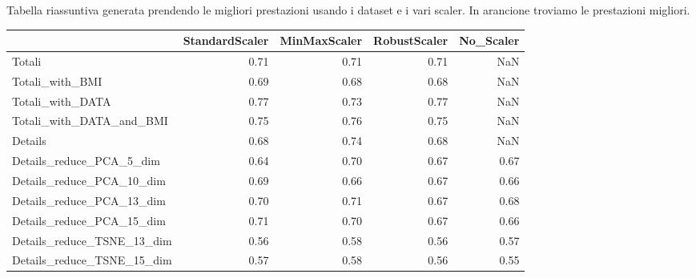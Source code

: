 \documentclass[12pt,italian]{report}
\begin{document}
\newpage
Tabella riassuntiva generata prendendo le migliori prestazioni usando i dataset e i vari scaler. In arancione troviamo le prestazioni migliori.
\begin{table}[h]
	\begin{center}
		\begin{adjustbox}{max width=\textwidth}
			\begin{tabular}{lrrrr}
				\toprule
				{} &  StandardScaler &  MinMaxScaler &  RobustScaler &  No\_Scaler \\
				\midrule
				Totali                     &        0.71 &      0.71 &      0.71 &        NaN \\
				Totali\_with\_BMI            &        0.69 &      0.68 &      0.68 &        NaN \\
				Totali\_with\_DATA           &        \cellcolor{orange}0.77 &      0.73 &      \cellcolor{orange}0.77 &        NaN \\
				Totali\_with\_DATA\_and\_BMI   &        0.75 &      0.76 &      0.75 &        NaN \\
				Details                    &        0.68 &      0.74 &      0.68 &        NaN \\
				Details\_reduce\_PCA\_5\_dim   &        0.64 &      0.70 &      0.67 &   0.67 \\
				Details\_reduce\_PCA\_10\_dim  &        0.69 &      0.66 &      0.67 &   0.66 \\
				Details\_reduce\_PCA\_13\_dim  &        0.70 &      0.71 &      0.67 &   0.68 \\
				Details\_reduce\_PCA\_15\_dim  &        0.71 &      0.70 &      0.67 &   0.66 \\
				Details\_reduce\_TSNE\_13\_dim &        0.56 &      0.58 &      0.56 &   0.57 \\
				Details\_reduce\_TSNE\_15\_dim &        0.57 &      0.58 &      0.56 &   0.55 \\
				\bottomrule
			\end{tabular}
		\end{adjustbox}
	\end{center}
\end{table}




		
\end{document}
